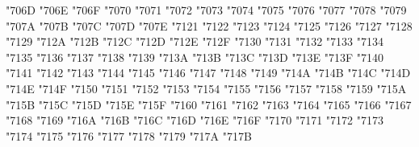 {\Uchar\jis"706D %
\Uchar\jis"706E %
\Uchar\jis"706F %
\Uchar\jis"7070 %
\Uchar\jis"7071 %
\Uchar\jis"7072 %
\Uchar\jis"7073 %
\Uchar\jis"7074 %
\Uchar\jis"7075 %
\Uchar\jis"7076 %
\Uchar\jis"7077 %
\Uchar\jis"7078 %
\Uchar\jis"7079 %
\Uchar\jis"707A %
\Uchar\jis"707B %
\Uchar\jis"707C %
\Uchar\jis"707D %
\Uchar\jis"707E %
\Uchar\jis"7121 %
\Uchar\jis"7122 %
\Uchar\jis"7123 %
\Uchar\jis"7124 %
\Uchar\jis"7125 %
\Uchar\jis"7126 %
\Uchar\jis"7127 %
\Uchar\jis"7128 %
\Uchar\jis"7129 %
\Uchar\jis"712A %
\Uchar\jis"712B %
\Uchar\jis"712C %
\Uchar\jis"712D %
\Uchar\jis"712E %
\Uchar\jis"712F %
\Uchar\jis"7130 %
\Uchar\jis"7131 %
\Uchar\jis"7132 %
\Uchar\jis"7133 %
\Uchar\jis"7134 %
\Uchar\jis"7135 %
\Uchar\jis"7136 %
\Uchar\jis"7137 %
\Uchar\jis"7138 %
\Uchar\jis"7139 %
\Uchar\jis"713A %
\Uchar\jis"713B %
\Uchar\jis"713C %
\Uchar\jis"713D %
\Uchar\jis"713E %
\Uchar\jis"713F %
\Uchar\jis"7140 %
\Uchar\jis"7141 %
\Uchar\jis"7142 %
\Uchar\jis"7143 %
\Uchar\jis"7144 %
\Uchar\jis"7145 %
\Uchar\jis"7146 %
\Uchar\jis"7147 %
\Uchar\jis"7148 %
\Uchar\jis"7149 %
\Uchar\jis"714A %
\Uchar\jis"714B %
\Uchar\jis"714C %
\Uchar\jis"714D %
\Uchar\jis"714E %
\Uchar\jis"714F %
\Uchar\jis"7150 %
\Uchar\jis"7151 %
\Uchar\jis"7152 %
\Uchar\jis"7153 %
\Uchar\jis"7154 %
\Uchar\jis"7155 %
\Uchar\jis"7156 %
\Uchar\jis"7157 %
\Uchar\jis"7158 %
\Uchar\jis"7159 %
\Uchar\jis"715A %
\Uchar\jis"715B %
\Uchar\jis"715C %
\Uchar\jis"715D %
\Uchar\jis"715E %
\Uchar\jis"715F %
\Uchar\jis"7160 %
\Uchar\jis"7161 %
\Uchar\jis"7162 %
\Uchar\jis"7163 %
\Uchar\jis"7164 %
\Uchar\jis"7165 %
\Uchar\jis"7166 %
\Uchar\jis"7167 %
\Uchar\jis"7168 %
\Uchar\jis"7169 %
\Uchar\jis"716A %
\Uchar\jis"716B %
\Uchar\jis"716C %
\Uchar\jis"716D %
\Uchar\jis"716E %
\Uchar\jis"716F %
\Uchar\jis"7170 %
\Uchar\jis"7171 %
\Uchar\jis"7172 %
\Uchar\jis"7173 %
\Uchar\jis"7174 %
\Uchar\jis"7175 %
\Uchar\jis"7176 %
\Uchar\jis"7177 %
\Uchar\jis"7178 %
\Uchar\jis"7179 %
\Uchar\jis"717A %
\Uchar\jis"717B %
}
